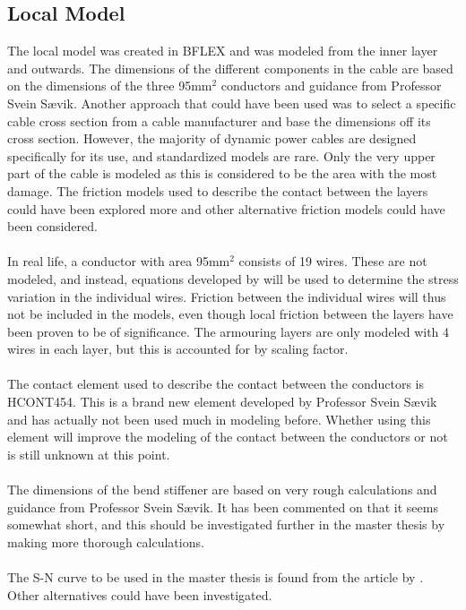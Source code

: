 \subsection{Local Model}
The local model was created in BFLEX and was modeled from the inner layer and outwards. The dimensions of the different components in the cable are based on the dimensions of the three 95mm$^2$ conductors and guidance from Professor Svein Sævik. Another approach that could have been used was to select a specific cable cross section from a cable manufacturer and base the dimensions off its cross section. However, the majority of dynamic power cables are designed specifically for its use, and standardized models are rare. Only the very upper part of the cable is modeled as this is considered to be the area with the most damage. The friction models used to describe the contact between the layers could have been explored more and other alternative friction models could have been considered. \\\\ In real life, a conductor with area 95mm$^2$ consists of 19 wires. These are not modeled, and instead, equations developed by \cite{savik2014} will be used to determine the stress variation in the individual wires. Friction between the individual wires will thus not be included in the models, even though local friction between the layers have been proven to be of significance. The armouring layers are only modeled with 4 wires in each layer, but this is accounted for by scaling factor. \\\\ The contact element used to describe the contact between the conductors is HCONT454. This is a brand new element developed by Professor Svein Sævik and has actually not been used much in modeling before. Whether using this element will improve the modeling of the contact between the conductors or not is still unknown at this point. \\\\The dimensions of the bend stiffener are based on very rough calculations and guidance from Professor Svein Sævik. It has been commented on that it seems somewhat short, and this should be investigated further in the master thesis by making more thorough calculations. \\\\ The S-N curve to be used in the master thesis is found from the article by \cite{savik2014}. Other alternatives could have been investigated. 

